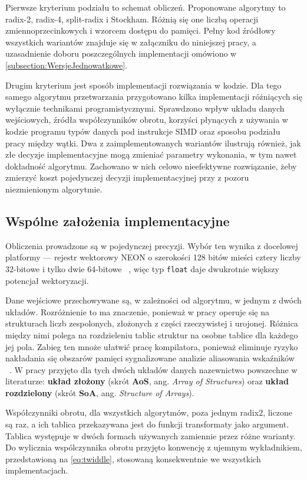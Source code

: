 Pierwsze kryterium podziału to schemat obliczeń. Proponowane algorytmy to radix-2, radix-4, split-radix i Stockham.
Różnią się one liczbą operacji zmiennoprzecinkowych i wzorcem dostępu do pamięci.
Pełny kod źródłowy wszystkich wariantów znajduje się w załączniku do niniejszej
pracy, a uzasadnienie doboru poszczególnych implementacji omówiono
w \cref{subsection:WersjeJednowatkowe}.

Drugim kryterium jest sposób implementacji rozwiązania w  kodzie. Dla
tego samego algorytmu przetwarzania przygotowano kilka implementacji różniących się
wyłącznie technikami programistycznymi. Sprawdzono wpływ układu danych wejściowych, źródła
współczynników obrotu, korzyści płynących z używania w kodzie programu typów danych pod instrukcje SIMD oraz sposobu
podziału pracy między wątki. 
Dwa z zaimplementowanych wariantów ilustrują również, jak złe decyzje implementacyjne mogą zmieniać parametry wykonania, w tym nawet dokładność algorytmu.
Zachowano w nich celowo nieefektywne rozwiązanie, żeby zmierzyć koszt pojedynczej decyzji implementacyjnej przy z pozoru niezmienionym algorytmie.

\subsection{Wspólne założenia implementacyjne}

Obliczenia prowadzone są w pojedynczej precyzji. Wybór ten wynika z docelowej
platformy — rejestr wektorowy NEON o szerokości 128 bitów mieści cztery liczby
32-bitowe i tylko dwie 64-bitowe ~\cite{ArmNeonGuide}, więc typ \texttt{float}
daje dwukrotnie większy potencjał wektoryzacji.

Dane wejściowe przechowywane są, w zależności od algorytmu, w jednym z dwóch układów. 
Rozróżnienie to ma znaczenie, ponieważ w pracy operuje się na strukturach liczb zespolonych, złożonych z części rzeczywistej i urojonej.
Różnica między nimi polega na rozdzieleniu tablic struktur na osobne tablice dla każdego jej pola. Zabieg ten mnoże ułatwić pracę
kompilatora, ponieważ eliminuje ryzyko nakładania się obszarów pamięci
sygnalizowane analizie aliasowania wskaźników ~\cite{ArmNeonGuide}. W pracy
przyjęto dla tych dwóch układów danych nazewnictwo powszechne w literaturze:
\textbf{układ złożony} (skrót \textbf{AoS}, ang. \textit{Array of Structures}) oraz
\textbf{układ rozdzielony} (skrót \textbf{SoA}, ang. \textit{Structure of Arrays}).

Współczynniki obrotu, dla wszystkich algorytmów, poza jednym radix2, liczone są raz, a ich tablica przekazywana jest
do funkcji transformaty jako argument. Tablica występuje w dwóch formach
używanych zamiennie przez różne warianty. Do wylicznia wspólczynnika obrotu przyjęto konwencję z ujemnym wykładnikiem,
przedstawioną na \cref{eq:twiddle}, stosowaną konsekwentnie we wszystkich implementacjach.

